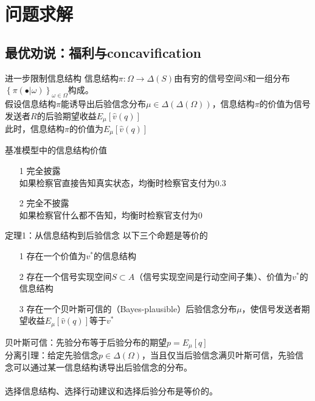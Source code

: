 \documentclass{beamer}
\begin{document}
\section{问题求解}

\subsection{最优劝说：福利与concavification}

\begin{frame}{进一步限制信息结构}
	信息结构$\pi : \Omega \to \Delta\left( S\right) $由\alert{有穷的}信号空间$S$和一组分布$ \left\lbrace \pi \left(\bullet | \omega \right)\right\rbrace_{\omega\in\Omega}  $构成。\\
	假设信息结构$\pi$能诱导出后验信念分布$\mu\in\Delta\left(\Delta\left( \Omega\right)\right) $，信息结构$\pi$的价值为信号发送者$R$的后验期望收益$E_{\mu}\left[\hat{v}\left(q\right)\right]  $\\
	此时，信息结构$\pi$的价值为$E_{\mu}\left[\hat{v}\left(q\right)\right]  $
\end{frame}

\begin{frame}{基准模型中的信息结构价值}
	\begin{itemize}
		\item[1] 完全披露\\
			如果检察官直接告知真实状态，均衡时检察官支付为0.3
		\item[2] 完全不披露\\
			如果检察官什么都不告知，均衡时检察官支付为0
	\end{itemize}
\end{frame}

\begin{frame}{定理1：从信息结构到后验信念}
	以下三个命题是等价的
	\begin{itemize}
		\item[1] 存在一个价值为$v^{*}$的信息结构
		\item[2] 存在一个信号实现空间$ S \subset A$（信号实现空间是行动空间子集）、价值为$v^{*}$的信息结构
		\item[3] 存在一个贝叶斯可信的（Bayes-plausible）后验信念分布$\mu$，使信号发送者期望收益$E_{\mu}\left[\hat{v}\left(q\right)\right] $等于$v^{*}$
	\end{itemize}
	贝叶斯可信：先验分布等于后验分布的期望$p=E_{\mu} \left[q\right]$\\
	分离引理：给定先验信念$ p\in \Delta \left( \Omega \right)$，当且仅当后验信念满贝叶斯可信，先验信念可以通过某一信息结构诱导出后验信念的分布。\\~\\
	选择信息结构、选择行动建议和选择后验分布是等价的。\\

\end{frame}
\end{document}
